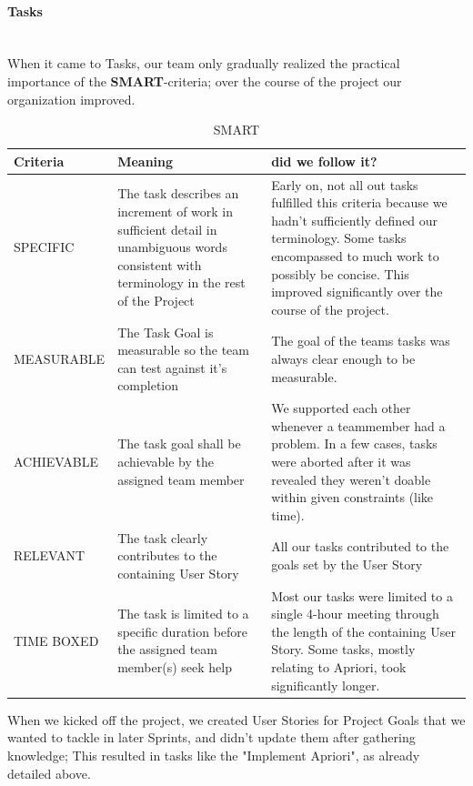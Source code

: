 \paragraph{Tasks} 
\ \\
When it came to Tasks, our team only gradually realized the practical importance of the \textbf{ SMART}-criteria; over the course of the project our organization improved.


\begin{table}[h!]
  \caption{SMART}
  \label{SMART}
  \centering
  \begin{tabular}{|p{3cm} | p{5cm}| p{5cm}|}
	\hline  	 
  	 Criteria & Meaning & did we follow it? \\ 
  	 \hline
  	 \hline
  	\hfill \break SPECIFIC & 
  	The task describes an increment of work in sufficient detail in unambiguous words consistent with terminology in the rest of the Project & 
  	 Early on, not all out tasks fulfilled this criteria because we hadn't sufficiently defined our terminology. Some tasks encompassed to much work to possibly  be concise. This improved significantly over the course of the project.\\ 
  	\hline
  	\hfill \break MEASURABLE &
  	 The Task Goal is measurable so the team can test against it's completion & The goal of the teams tasks was always clear enough to be measurable. \\ 
  	\hline
  	\hfill \break ACHIEVABLE &
  	 The task goal shall be achievable by the assigned team member &
  	 We supported each other whenever a teammember had a problem. In a few cases, tasks were aborted after it was revealed they weren't doable within given constraints (like time).   \\ 
  	\hline
  	\hfill \break RELEVANT &
  	 The task clearly contributes to the containing User Story & 
  	 All our tasks contributed to the goals set by the User Story   \\ 
  	\hline
  	\hfill \break TIME BOXED &
  	 The task is limited to a specific duration before the assigned team member(s) seek help & Most our tasks were limited to a single 4-hour meeting through the length of the containing User Story. Some tasks, mostly relating to Apriori, took significantly longer. 
  	    \\ 
  	\hline
  	  \end{tabular}
\end{table}

When we kicked off the project, we created User Stories for Project Goals that we wanted to tackle in later Sprints, and didn't update them after gathering knowledge; This resulted in tasks like the "Implement Apriori", as already detailed above.
\newpage

